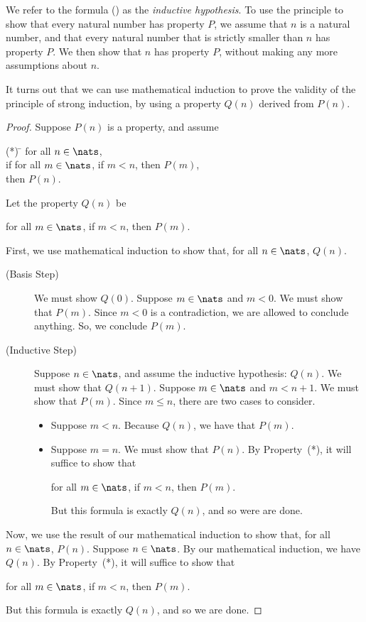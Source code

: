We refer to the formula (\dag) as the \emph{inductive hypothesis}.
%
%
To use the principle to show that every natural number has property
$P$, we assume that $n$ is a natural number, and that
every natural number that is strictly smaller than $n$ has
property $P$.  We then show that $n$ has property $P$,
without making any more assumptions about $n$.

It turns out that we can use mathematical induction to prove the
validity of the principle of strong induction, by using a property
$Q(n)$ derived from $P(n)$.

\begin{proof}
Suppose $P(n)$ is a property, and assume
\begin{ctabbing}
(*) \=\+ for all $n\in\nats$, \\
if for all $m\in\nats$, if $m<n$, then $P(m)$, \\
then $P(n)$.
\end{ctabbing}
Let the property $Q(n)$ be
\begin{center}
for all $m\in\nats$, if $m<n$, then $P(m)$.
\end{center}

First, we use mathematical induction to show that, for all
$n\in\nats$, $Q(n)$.
\begin{description}
\item[\quad(Basis Step)] We must show $Q(0)$.
Suppose $m\in\nats$ and $m<0$.  We must show
that $P(m)$.  Since $m<0$ is a contradiction,
%
we are allowed to conclude anything.  So, we conclude $P(m)$.

\item[\quad(Inductive Step)] Suppose $n\in\nats$, and assume
the inductive hypothesis: $Q(n)$.  We must show that $Q(n+1)$.
Suppose $m\in\nats$ and $m<n+1$.  We must show that
$P(m)$.  Since $m\leq n$, there are two cases to consider.
\begin{itemize}
\item Suppose $m<n$.  Because $Q(n)$, we have
that $P(m)$.

\item Suppose $m=n$.  We must show that $P(n)$.
By Property~(*), it will suffice to show that
\begin{center}
for all $m\in\nats$, if $m<n$, then $P(m)$.
\end{center}
But this formula is exactly $Q(n)$, and so were are done.
\end{itemize}
\end{description}

Now, we use the result of our mathematical induction to show that, for
all $n\in\nats$, $P(n)$.  Suppose $n\in\nats$.  By our mathematical
induction, we have $Q(n)$.  By Property~(*), it will suffice to show
that
\begin{center}
for all $m\in\nats$, if $m<n$, then $P(m)$.
\end{center}
But this formula is exactly $Q(n)$, and so we are done.
\end{proof}


